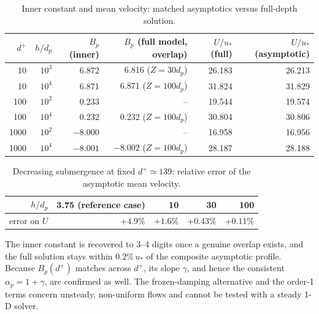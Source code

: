 \documentclass[10pt,a4paper]{article}
\begin{document}
\begin{table}[h]\centering\small
\begin{tabular}{rrrrrr}
\toprule
$d^+$ & $h/d_p$ & $B_p$ (inner) & $B_p$ (full model, overlap) & $U/u_*$ (full) & $U/u_*$ (asymptotic)\\
\midrule
10 & $10^3$ & 6.872 & 6.816 ($Z=30d_p$) & 26.183 & 26.213\\
10 & $10^4$ & 6.871 & 6.871 ($Z=100d_p$) & 31.824 & 31.829\\
100 & $10^2$ & 0.233 & -- & 19.544 & 19.574\\
100 & $10^4$ & 0.232 & 0.232 ($Z=100d_p$) & 30.804 & 30.806\\
1000 & $10^2$ & $-8.000$ & -- & 16.958 & 16.956\\
1000 & $10^4$ & $-8.001$ & $-8.002$ ($Z=100d_p$) & 28.187 & 28.188\\
\bottomrule
\end{tabular}
\caption{Inner constant and mean velocity: matched asymptotics versus full-depth solution.}\label{tab:valid}
\end{table}

\begin{table}[h]\centering\small
\begin{tabular}{rrrrr}
\toprule
$h/d_p$ & 3.75 (reference case) & 10 & 30 & 100\\
\midrule
error on $U$ & $+4.9\%$ & $+1.6\%$ & $+0.43\%$ & $+0.11\%$\\
\bottomrule
\end{tabular}
\caption{Decreasing submergence at fixed $d^+\simeq139$: relative error of the asymptotic mean velocity.}\label{tab:shallow}
\end{table}

The inner constant is recovered to 3--4 digits once a genuine overlap exists, and the full solution stays within $0.2\%\,u_*$ of the composite asymptotic profile. Because $B_p(d^+)$ matches across $d^+$, its slope $\gamma$, and hence the consistent $\alpha_p=1+\gamma$, are confirmed as well. The frozen-damping alternative and the order-1 terms concern unsteady, non-uniform flows and cannot be tested with a steady 1-D solver.

\end{document}
